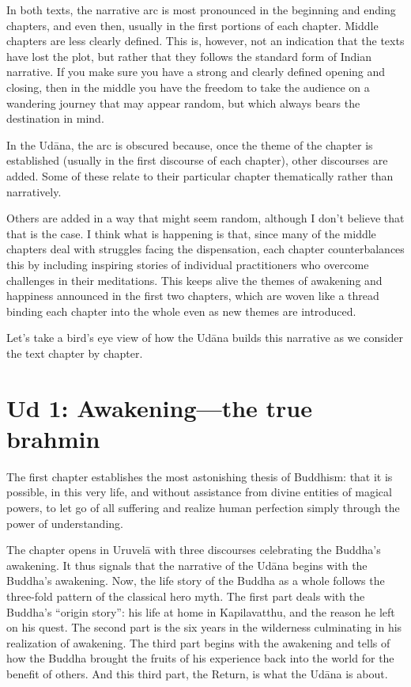 \documentclass[12pt,openany]{book}%
\begin{document}
In both texts, the narrative arc is most pronounced in the beginning and ending chapters, and even then, usually in the first portions of each chapter. Middle chapters are less clearly defined. This is, however, not an indication that the texts have lost the plot, but rather that they follows the standard form of Indian narrative. If you make sure you have a strong and clearly defined opening and closing, then in the middle you have the freedom to take the audience on a wandering journey that may appear random, but which always bears the destination in mind.

In the \textsanskrit{Udāna}, the arc is obscured because, once the theme of the chapter is established (usually in the first discourse of each chapter), other discourses are added. Some of these relate to their particular chapter thematically rather than narratively. 

Others are added in a way that might seem random, although I don’t believe that that is the case. I think what is happening is that, since many of the middle chapters deal with struggles facing the dispensation, each chapter counterbalances this by including inspiring stories of individual practitioners who overcome challenges in their meditations. This keeps alive the themes of awakening and happiness announced in the first two chapters, which are woven like a thread binding each chapter into the whole even as new themes are introduced.

Let’s take a bird’s eye view of how the \textsanskrit{Udāna} builds this narrative as we consider the text chapter by chapter. 

\section*{Ud 1: Awakening—the true brahmin}

The first chapter establishes the most astonishing thesis of Buddhism: that it is possible, in this very life, and without assistance from divine entities of magical powers, to let go of all suffering and realize human perfection simply through the power of understanding.

The chapter opens in \textsanskrit{Uruvelā} with three discourses celebrating the Buddha’s awakening. It thus signals that the narrative of the \textsanskrit{Udāna} begins with the Buddha’s awakening. Now, the life story of the Buddha as a whole follows the three-fold pattern of the classical hero myth. The first part deals with the Buddha’s “origin story”: his life at home in Kapilavatthu, and the reason he left on his quest. The second part is the six years in the wilderness culminating in his realization of awakening. The third part begins with the awakening and tells of how the Buddha brought the fruits of his experience back into the world for the benefit of others. And this third part, the Return, is what the \textsanskrit{Udāna} is about.
\end{document}
